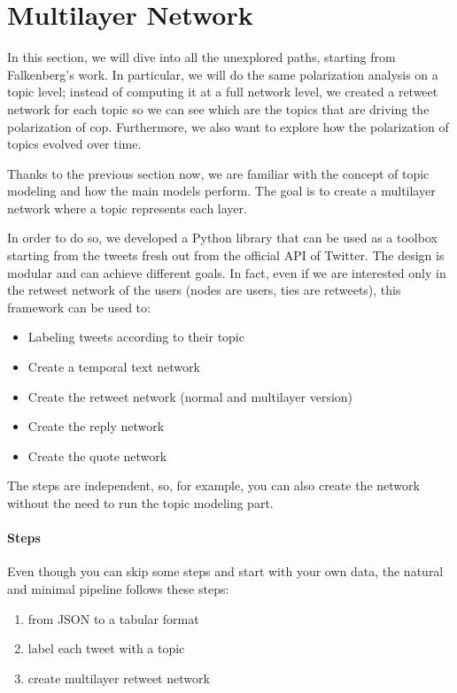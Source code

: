 
\section{Multilayer Network}

In this section, we will dive into all the unexplored paths, starting from Falkenberg's work. In particular, we will do the same polarization analysis on a topic level; instead of computing it at a full network level, we created a retweet network for each topic so we can see which are the topics that are driving the polarization of cop. Furthermore, we also want to explore how the polarization of topics evolved over time.

Thanks to the previous section now, we are familiar with the concept of topic modeling and how the main models perform. The goal is to create a multilayer network where a topic represents each layer. 

In order to do so, we developed a Python library that can be used as a toolbox starting from the tweets fresh out from the official API of Twitter. The design is modular and can achieve different goals.
In fact, even if we are interested only in the retweet network of the users (nodes are users, ties are retweets), this framework can be used to: 

\begin{itemize}
    \item Labeling tweets according to their topic
    \item Create a temporal text network 
    \item Create the retweet network (normal and multilayer version)
    \item Create the reply network
    \item Create the quote network

\end{itemize}

The steps are independent, so, for example, you can also create the network without the need to run the topic modeling part.

\paragraph{Steps}
Even though you can skip some steps and start with your own data, the natural and minimal pipeline follows these steps:


\begin{enumerate}
    \item from JSON to a tabular format 
    \item label each tweet with a topic
    \item create multilayer retweet network  
    
\end{enumerate} 


